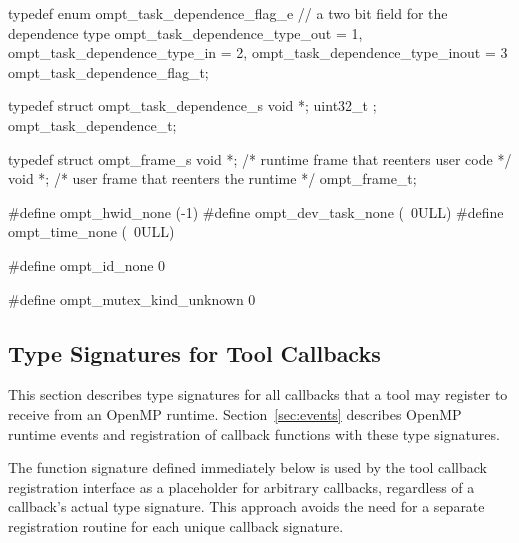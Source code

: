 \documentclass{article}
\begin{document}
\begin{boxedcode}
typedef enum ompt\_task\_dependence\_flag\_e {
  // a two bit field for the dependence type
  ompt\_task\_dependence\_type\_out       = 1,
  ompt\_task\_dependence\_type\_in        = 2,
  ompt\_task\_dependence\_type\_inout     = 3
} ompt\_task\_dependence\_flag\_t;

typedef struct ompt\_task\_dependence\_s {
  void *;
  uint32\_t  ;
} ompt\_task\_dependence\_t;

typedef struct ompt\_frame\_s {
  void *;                           /* runtime frame that reenters user code       */
  void *;                          /* user frame that reenters the runtime        */
} ompt\_frame\_t;

#define ompt\_hwid\_none                (-1)
#define ompt\_dev\_task\_none            (~0ULL)
#define ompt\_time\_none                (~0ULL)

#define ompt\_id\_none                  0

#define ompt\_mutex\_kind\_unknown       0
\end{boxedcode}
\clearpage

\subsection{Type Signatures for Tool Callbacks}
\label{appendix:ompt-types:callbacks}
This section describes type signatures for all  callbacks that a tool may register to receive from an OpenMP runtime. Section~\ref{sec:events} describes OpenMP runtime events and registration of
callback functions with these type signatures.

The function signature   defined immediately below is used by the tool callback registration interface as a placeholder for arbitrary callbacks,
 regardless of a callback's actual type signature. This approach avoids the need for a separate registration routine for each unique callback signature. 
\end{document}

